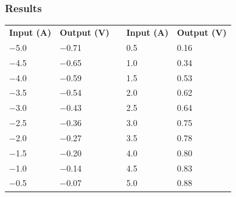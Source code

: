 \subsubsection{Results}

\begin{table}[H]
\centering
\begin{tabular}{|l|l|l| l|l|}
\cline{1-2}\cline{4-5}%
  \textbf{Input (A)}   & \textbf{Output (V)} &\phantom{hey}& \textbf{Input (A)}   & \textbf{Output (V)}\\
\cline{1-2}\cline{4-5}%
  \num{-5,0}           &       \num{-0,71}   &             & \num{0,5}            & \num{0,16}         \\
\cline{1-2}\cline{4-5}%
  \num{-4,5}           &       \num{-0,65}   &             & \num{1,0}            & \num{0,34}         \\
\cline{1-2}\cline{4-5}%
  \num{-4,0}           &       \num{-0,59}   &             & \num{1,5}            & \num{0,53}         \\
\cline{1-2}\cline{4-5}%
  \num{-3,5}           &       \num{-0,54}   &             & \num{2,0}            & \num{0,62}         \\
\cline{1-2}\cline{4-5}%
  \num{-3,0}           &       \num{-0,43}   &             & \num{2,5}            & \num{0,64}         \\
\cline{1-2}\cline{4-5}%
  \num{-2,5}           &       \num{-0,36}   &             & \num{3,0}            & \num{0,75}         \\
\cline{1-2}\cline{4-5}%
  \num{-2,0}           &       \num{-0,27}   &             & \num{3,5}            & \num{0,78}         \\
\cline{1-2}\cline{4-5}%
  \num{-1,5}           &       \num{-0,20}   &             & \num{4,0}            & \num{0,80}         \\
\cline{1-2}\cline{4-5}%
  \num{-1,0}           &       \num{-0,14}   &             & \num{4.5}            & \num{0.83}         \\
\cline{1-2}\cline{4-5}%
  \num{-0,5}           &       \num{-0,07}   &             & \num{5.0}            & \num{0.88}         \\
\cline{1-2}\cline{4-5}%
\end{tabular}
\end{table}

